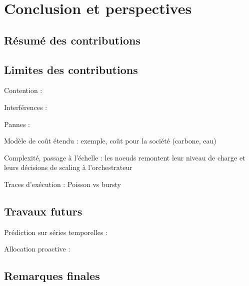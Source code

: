 \chapter{Conclusion et perspectives}
\label{chapter:conclusion}

\section{Résumé des contributions}

\section{Limites des contributions}

Contention : \cite{vanbeekCPUContentionPredictor2019} \cite{jacquetSweetspotVMOversubscribingCPU}

Interférences : \cite{kohAnalysisPerformanceInterference2007} \cite{vardasImprovedParallelApplication}

Pannes : \cite{javadiFailureTraceArchive2013, galletModelSpaceCorrelatedFailures2010}

Modèle de coût étendu : exemple, coût pour la société (carbone, eau) \cite{rickeCountrylevelSocialCost2018}

Complexité, passage à l'échelle : les noeuds remontent leur niveau de charge et leurs décisions de scaling à l'orchestrateur \cite{straesserPowerApplicationsVision2023}

Traces d'exécution : Poisson vs bursty

\section{Travaux futurs}


Prédiction sur séries temporelles : \cite{bauerTimeSeriesForecasting2020}

Allocation proactive : \cite{parkGraphNeuralNetworkBased2024}

\section{Remarques finales}
